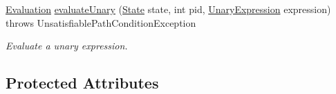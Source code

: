 \begin{DoxyCompactItemize}
\hyperlink{classedu_1_1udel_1_1cis_1_1vsl_1_1civl_1_1semantics_1_1IF_1_1Evaluation}{Evaluation} \hyperlink{classedu_1_1udel_1_1cis_1_1vsl_1_1civl_1_1semantics_1_1common_1_1CommonEvaluator_a2cff47c5ffdf83ebb829ef5ed22e63f6}{evaluate\+Unary} (\hyperlink{interfaceedu_1_1udel_1_1cis_1_1vsl_1_1civl_1_1state_1_1IF_1_1State}{State} state, int pid, \hyperlink{interfaceedu_1_1udel_1_1cis_1_1vsl_1_1civl_1_1model_1_1IF_1_1expression_1_1UnaryExpression}{Unary\+Expression} expression)  throws Unsatisfiable\+Path\+Condition\+Exception 
\begin{DoxyCompactList}\small\item\em Evaluate a unary expression. \end{DoxyCompactList}\end{DoxyCompactItemize}
\subsection*{Protected Attributes}
